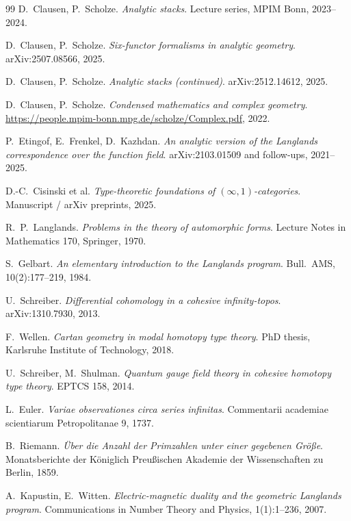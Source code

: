 \documentclass[12pt]{article}
\theoremstyle{definition}
\theoremstyle{remark}
\begin{document}
\begin{thebibliography}{99}
D.\ Clausen, P.\ Scholze.
\textit{Analytic stacks}.
Lecture series, MPIM Bonn, 2023--2024.

D.\ Clausen, P.\ Scholze.
\textit{Six-functor formalisms in analytic geometry}.
arXiv:2507.08566, 2025.

D.\ Clausen, P.\ Scholze.
\textit{Analytic stacks (continued)}.
arXiv:2512.14612, 2025.

D.\ Clausen, P.\ Scholze.
\textit{Condensed mathematics and complex geometry}.
\url{https://people.mpim-bonn.mpg.de/scholze/Complex.pdf}, 2022.

P.\ Etingof, E.\ Frenkel, D.\ Kazhdan.
\textit{An analytic version of the Langlands correspondence over the
function field}.
arXiv:2103.01509 and follow-ups, 2021--2025.

D.-C.\ Cisinski et al.
\textit{Type-theoretic foundations of $(\infty,1)$-categories}.
Manuscript / arXiv preprints, 2025.

R.\ P.\ Langlands.
\textit{Problems in the theory of automorphic forms}.
Lecture Notes in Mathematics 170, Springer, 1970.

S.\ Gelbart.
\textit{An elementary introduction to the Langlands program}.
Bull.\ AMS, 10(2):177--219, 1984.

U.\ Schreiber.
\textit{Differential cohomology in a cohesive infinity-topos}.
arXiv:1310.7930, 2013.

F.\ Wellen.
\textit{Cartan geometry in modal homotopy type theory}.
PhD thesis, Karlsruhe Institute of Technology, 2018.

U.\ Schreiber, M.\ Shulman.
\textit{Quantum gauge field theory in cohesive homotopy type theory}.
EPTCS 158, 2014.

L.\ Euler.
\textit{Variae observationes circa series infinitas}.
Commentarii academiae scientiarum Petropolitanae 9, 1737.

B.\ Riemann.
\textit{Über die Anzahl der Primzahlen unter einer gegebenen Größe}.
Monatsberichte der Königlich Preußischen Akademie der Wissenschaften zu
Berlin, 1859.

A.\ Kapustin, E.\ Witten.
\textit{Electric-magnetic duality and the geometric Langlands program}.
Communications in Number Theory and Physics, 1(1):1--236, 2007.


\end{thebibliography}
\end{document}
